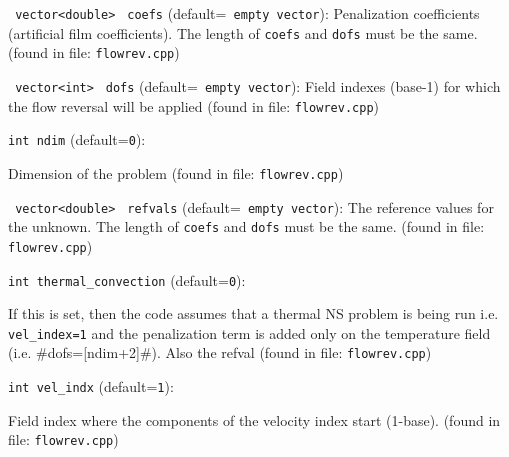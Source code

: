\item\verb+ vector<double>+ \verb+ coefs+ {\rm(default=\verb| empty vector|)}:
 Penalization coefficients (artificial film coefficients).
The length of \verb+coefs+ and \verb+dofs+ must be the same.  (found in file: \verb+flowrev.cpp+)
\item\verb+ vector<int>+ \verb+ dofs+ {\rm(default=\verb| empty vector|)}:
 Field indexes (base-1) for which the flow
reversal will be applied  (found in file: \verb+flowrev.cpp+)
\item\verb+int ndim+ {\rm(default=\verb|0|)}:

Dimension of the problem
 (found in file: \verb+flowrev.cpp+)
\item\verb+ vector<double>+ \verb+ refvals+ {\rm(default=\verb| empty vector|)}:
 The reference values for the unknown.  
The length of \verb+coefs+ and \verb+dofs+ must be the same.  (found in file: \verb+flowrev.cpp+)
\item\verb+int thermal_convection+ {\rm(default=\verb|0|)}:

If this is set, then
 the code assumes that a thermal NS problem is being run
 i.e. \verb+vel_index=1+ and the penalization term is added only
 on the temperature field (i.e. #dofs=[ndim+2]#). Also the refval 
 (found in file: \verb+flowrev.cpp+)
\item\verb+int vel_indx+ {\rm(default=\verb|1|)}:

Field index where the components of the
 velocity index start (1-base).
 (found in file: \verb+flowrev.cpp+)
